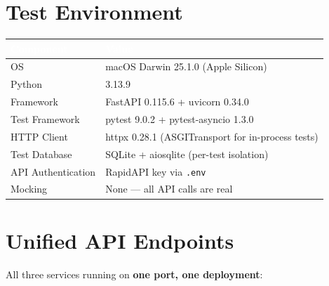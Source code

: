 \documentclass[11pt, a4paper]{article}
\begin{document}
\section{Test Environment}

\begin{center}\small
\begin{tabularx}{\textwidth}{|L{4cm}|X|}
\hline
{}
\textcolor{white}{\textbf{Component}} & \textcolor{white}{\textbf{Value}} \\
\hline
OS & macOS Darwin 25.1.0 (Apple Silicon) \\
Python & 3.13.9 \\
Framework & FastAPI 0.115.6 + uvicorn 0.34.0 \\
Test Framework & pytest 9.0.2 + pytest-asyncio 1.3.0 \\
HTTP Client & httpx 0.28.1 (ASGITransport for in-process tests) \\
Test Database & SQLite + aiosqlite (per-test isolation) \\
API Authentication & RapidAPI key via \texttt{.env} \\
Mocking & None --- all API calls are real \\
\hline
\end{tabularx}
\end{center}

\section{Unified API Endpoints}

All three services running on \textbf{one port, one deployment}:
\end{document}
